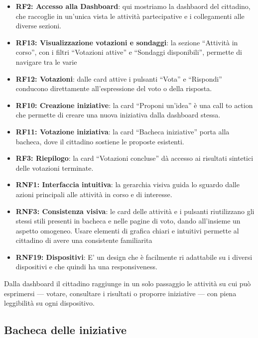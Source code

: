 \documentclass{article}
\begin{document}
\begin{itemize}
    \item \textbf{RF2: Accesso alla Dashboard}: qui mostriamo la dashbaord del cittadino, che raccoglie in un'unica vista le attivit\`a partecipative e i collegamenti alle diverse sezioni.
    \item \textbf{RF13: Visualizzazione votazioni e sondaggi}: la sezione ``Attivit\`a in corso'', con i filtri ``Votazioni attive'' e ``Sondaggi disponibili'', permette di navigare tra le varie
    \item \textbf{RF12: Votazioni}: dalle card attive i pulsanti ``Vota'' e ``Rispondi'' conducono direttamente all'espressione del voto o della risposta.
    \item \textbf{RF10: Creazione iniziative}: la card ``Proponi un'idea'' è una call to action che permette di creare una nuova iniziativa dalla dashboard stessa.
    \item \textbf{RF11: Votazione iniziativa}: la card ``Bacheca iniziative'' porta alla bacheca, dove il cittadino sostiene le proposte esistenti.
    \item \textbf{RF3: Riepilogo}: la card ``Votazioni concluse'' d\`a accesso ai risultati sintetici delle votazioni terminate.
    \item \textbf{RNF1: Interfaccia intuitiva}: la gerarchia visiva guida lo sguardo dalle azioni principali alle attivit\`a in corso e di interesse.
    \item \textbf{RNF3: Consistenza visiva}: le card delle attivit\`a e i pulsanti riutilizzano gli stessi stili presenti in bacheca e nelle pagine di voto, dando all'insieme un aspetto omogeneo.  Usare elementi di grafica chiari e intuitivi permette al cittadino di avere una consistente familiarita 
    \item \textbf{RNF19: Dispositivi}: E' un design che è facilmente ri adattabile su i diversi dispositivi e che quindi ha una responsiveness.
\end{itemize}

Dalla dashboard il cittadino raggiunge in un solo passaggio le attivit\`a su cui pu\`o esprimersi --- votare, consultare i risultati o proporre iniziative --- con piena leggibilit\`a su ogni dispositivo.


\subsection*{Bacheca delle iniziative}
\end{document}

